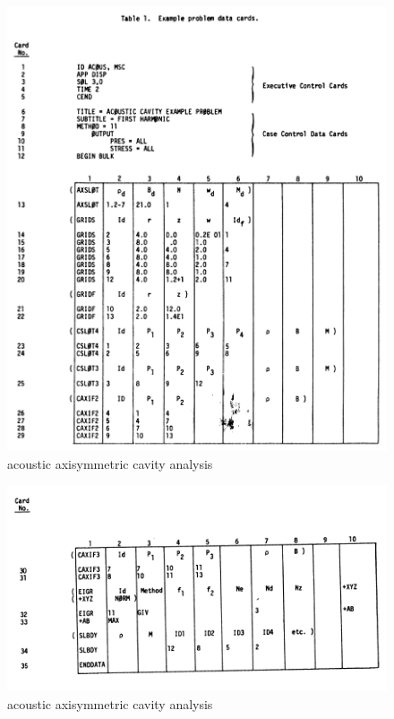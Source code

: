 \documentclass{article}
\begin{document}
\begin{figure}[h]
    \centering
\includegraphics[scale=0.35]{nastran_fig4}
    \caption{acoustic axisymmetric cavity analysis}
\end{figure}

\begin{figure}[h]
    \centering
\includegraphics[scale=0.35]{nastran_fig5}
    \caption{acoustic axisymmetric cavity analysis}
\end{figure}
\end{document}
